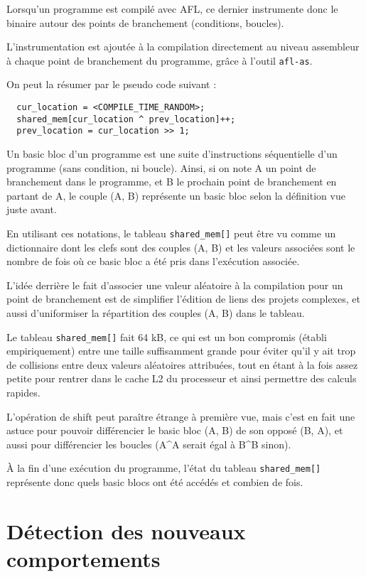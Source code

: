 Lorsqu'un programme est compilé avec AFL, ce dernier instrumente donc le
binaire autour des points de branchement (conditions, boucles).

L'instrumentation est ajoutée à la compilation directement au niveau
assembleur à chaque point de branchement du programme, grâce à l'outil
\lstinline{afl-as}.

On peut la résumer par le pseudo code suivant :

\begin{lstlisting}
  cur_location = <COMPILE_TIME_RANDOM>;
  shared_mem[cur_location ^ prev_location]++;
  prev_location = cur_location >> 1;
\end{lstlisting}

Un basic bloc d'un programme est une suite d'instructions séquentielle d'un
programme (sans condition, ni boucle). Ainsi, si on note A un point de
branchement dans le programme, et B le prochain point de branchement en
partant de A, le couple (A, B) représente un basic bloc selon la définition
vue juste avant.

En utilisant ces notations, le tableau \lstinline{shared_mem[]} peut être vu
comme un dictionnaire dont les clefs sont des couples (A, B) et les valeurs
associées sont le nombre de fois où ce basic bloc a été pris dans
l'exécution associée.

L'idée derrière le fait d'associer une valeur aléatoire à la compilation
pour un point de branchement est de simplifier l'édition de liens des
projets complexes, et aussi d'uniformiser la répartition des couples
(A, B) dans le tableau.

Le tableau \lstinline{shared_mem[]} fait 64 kB, ce qui est un bon compromis
(établi empiriquement) entre une taille suffisamment grande pour éviter qu'il y
ait trop de collisions entre deux valeurs aléatoires attribuées, tout en
étant à la fois assez petite pour rentrer dans le cache L2 du processeur
et ainsi permettre des calculs rapides.

L'opération de shift peut paraître étrange à première vue, mais c'est en
fait une astuce pour pouvoir différencier le basic bloc (A, B) de
son opposé (B, A), et aussi pour différencier les boucles
(A\textasciicircum A serait égal à B\textasciicircum B sinon).

À la fin d'une exécution du programme, l'état du tableau
\lstinline{shared_mem[]} représente donc quels basic blocs ont été accédés
et combien de fois.

\section{Détection des nouveaux comportements}\label{nouveaux_comportements}

